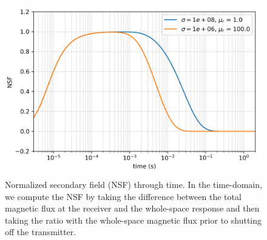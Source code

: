 \begin{figure}[htb]
    \begin{center}
    \includegraphics[width=0.6\columnwidth]{figures/casing_software/tdemNSF.png}
    \end{center}
\caption{
    Normalized secondary field (NSF) through time.
    In the time-domain, we compute the NSF by taking the difference between the total magnetic flux at the receiver and the whole-space response
    and then taking the ratio with the whole-space magnetic flux prior to shutting off the transmitter.
}
\label{fig:tdemNSF}
\end{figure}
